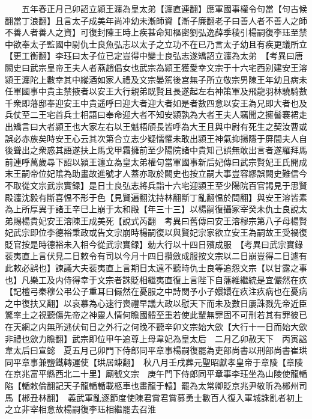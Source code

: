 　　五年春正月己卯詔立潁王瀍為皇太弟【瀍直連翻】應軍國事權令句當【句古候翻當丁浪翻】且言太子成美年尚冲幼未漸師資【漸子廉翻老子曰善人者不善人之師不善人者善人之資】可復封陳王時上疾甚命知樞密劉弘逸薛季稜引楊嗣復李珏至禁中欲奉太子監國中尉仇士良魚弘志以太子之立功不在已乃言太子幼且有疾更議所立【更工衡翻】李珏曰太子位已定豈得中變士良弘志遂矯詔立瀍為太弟　【考異曰唐闕史曰武宗皇帝王夫人者燕趙倡女也武宗為潁王獲愛幸文宗于十六宅西别建安王溶潁王瀍陀上數幸其中縱酒如家人禮及文宗晏駕後宫無子所立敬宗男陳王年幼且病未任軍國事中貴主禁掖者以安王大行親弟既賢且長遂起左右神策軍及飛龍羽林驍騎數千衆即藩邸奉迎安王中貴遥呼曰迎大者迎大者如是者數四意以安王為兄即大者也及兵仗至二王宅首兵士相語曰奉命迎大者不知安潁孰為大者王夫人竊聞之擁髻褰裙走出矯言曰大者潁王也大家左右以王魁梧頎長皆呼為大王且與中尉有死生之契汝曹或誤必赤族矣時安王心云其次第合立志少疑懦懼未敢出潁王神氣抑揚隱于屏間夫人自後聳出之衆惑其語遂扶上馬戈甲霜擁前至少陽院諸中貴知己誤無敢出言者遂羅拜馬前連呼萬歲尋下詔以潁王瀍立為皇太弟權句當軍國事新后妃傳曰武宗賢妃王氏開成末王嗣帝位妃隂為助畫故進號才人蓋亦取於闕史也按立嗣大事豈容繆誤闕史難信今不取從文宗武宗實録】是日士良弘志將兵詣十六宅迎潁王至少陽院百官謁見于思賢殿瀍沈毅有斷喜愠不形于色【見賢遍翻沈持林翻斷丁亂翻愠於問翻】與安王溶皆素為上所厚異于諸王辛巳上崩于太和殿【年三十三】以楊嗣復攝冢宰癸未仇士良說太弟賜楊貴妃安王溶陳王成美死【說式芮翻　考異曰舊傳曰安王溶穆宗第八子母楊賢妃武宗即位李德裕秉政或告文宗崩時楊嗣復以與賢妃宗家欲立安王為嗣故王受禍復貶官按是時德裕未入相今從武宗實録】勅大行以十四日殯成服　【考異曰武宗實錄裴夷直上言伏見二日敕令有司以今月十四日攢斂成服按文宗以二日崩豈得二日遽有此敕必誤也】諫議大夫裴夷直上言期日太遠不聽時仇士良等追怨文宗【以甘露之事也】凡樂工及内侍得幸于文宗者誅貶相繼夷直復上言陛下自藩維繼統是宜儼然在疚【記檀弓秦穆公弔公子重耳曰儼然在憂服之中詩閔予小子嬛嬛在疚注疚病也在憂病之中復扶又翻】以哀慕為心速行喪禮早議大政以慰天下而未及數日屢誅戮先帝近臣驚率土之視聽傷先帝之神靈人情何瞻國體至重若使此輩無罪固不可刑若其有罪彼已在天網之内無所逃伏旬日之外行之何晚不聽辛卯文宗始大歛【大行十一日而始大歛非禮也歛力瞻翻】武宗即位甲午追尊上母韋妃為皇太后　二月乙卯赦天下　丙寅諡韋太后曰宣懿　夏五月己卯門下侍郎同平章事楊嗣復罷為吏部尚書以刑部尚書崔珙同平章事兼鹽鐵轉運使【珙居竦翻】　秋八月壬戌葬元聖昭獻孝皇帝于章陵【章陵在京兆富平縣西北二十里】廟號文宗　庚午門下侍郎同平章事李珏坐為山陵使龍輴陷【輴敕倫翻記天子龍輴輴載柩車也畫龍于轅】罷為太常卿貶京兆尹敬昕為郴州司馬【郴丑林翻】　義武軍亂逐節度使陳君賞君賞募勇士數百人復入軍城誅亂者初上之立非宰相意故楊嗣復李珏相繼罷去召淮

